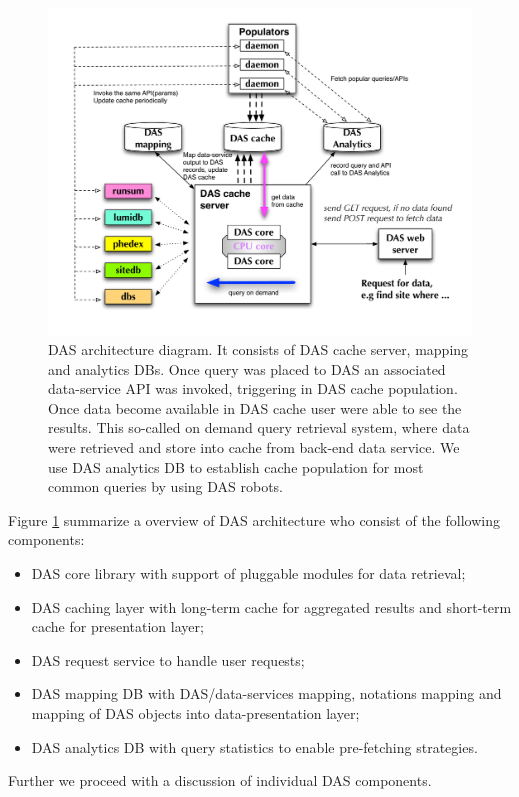 \documentclass[a4paper]{jpconf}
\begin{document}
\begin{figure}[htb]
\centering
\includegraphics[width=150mm]{DAS_Cache_and_Analytics.pdf}
\caption{
DAS architecture diagram. It consists of DAS cache server, mapping and analytics DBs.
Once query was placed to DAS an associated
data-service API was invoked, triggering in DAS cache population. Once data become
available in DAS cache user were able to see the results. This so-called on demand
query retrieval system, where data were retrieved and store into cache from
back-end data service. We use DAS analytics DB to establish cache population
for most common queries by using DAS robots.
}
\label{DAS_cache}
\end{figure}

\noindent
Figure \ref{DAS_cache} summarize a overview of DAS architecture who consist of the
following components:
\begin{itemize}
\item DAS core library with support of pluggable modules for data retrieval;
\item DAS caching layer with long-term cache for aggregated results and short-term
cache for presentation layer;
\item DAS request service to handle user requests;
\item DAS mapping DB with DAS/data-services mapping, notations mapping and
mapping of DAS objects into data-presentation layer;
\item DAS analytics DB with query statistics to enable pre-fetching 
strategies.
\end{itemize}
Further we proceed with a discussion of individual DAS components.
\end{document}
